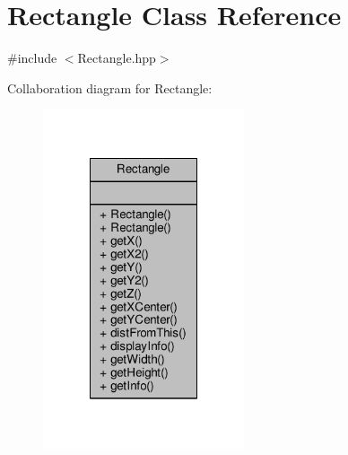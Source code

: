 \hypertarget{class_rectangle}{\section{Rectangle Class Reference}
\label{class_rectangle}
}


{\ttfamily \#include $<$Rectangle.\-hpp$>$}



Collaboration diagram for Rectangle\-:\nopagebreak
\begin{figure}[H]
\begin{center}
\leavevmode
\includegraphics[width=168pt]{class_rectangle__coll__graph}
\end{center}
\end{figure}
